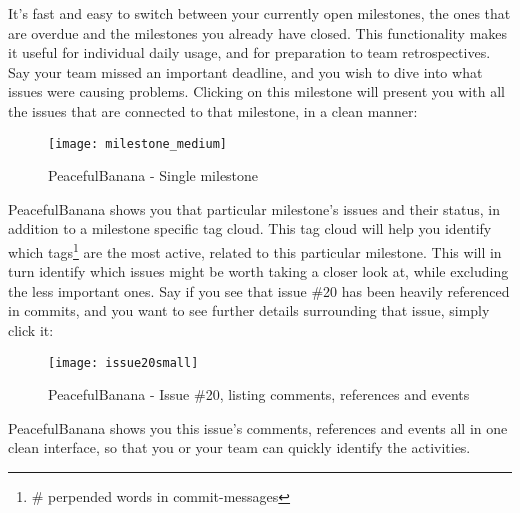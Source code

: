It's fast and easy to switch between your currently open milestones, the ones that are overdue and the milestones you already have closed. This functionality makes it useful for individual daily usage, and for preparation to team retrospectives. Say your team missed an important deadline, and you wish to dive into what issues were causing problems. Clicking on this milestone will present you with all the issues that are connected to that milestone, in a clean manner:
\begin{figure}[h!]
\label{milestonessingular}
\centering
	\texttt{[image: milestone\_medium]}
\caption{PeacefulBanana - Single milestone}
\end{figure}
PeacefulBanana shows you that particular milestone's issues and their status, in addition to a milestone specific tag cloud. This tag cloud will help you identify which tags\footnote{\# perpended words in commit-messages} are the most active, related to this particular milestone. This will in turn identify which issues might be worth taking a closer look at, while excluding the less important ones. 
Say if you see that issue \#20 has been heavily referenced in commits, and you want to see further details surrounding that issue, simply click it:
\begin{figure}[h!]
\label{milestonessingular}
\centering
	\texttt{[image: issue20small]}
\caption{PeacefulBanana - Issue \#20, listing comments, references and events}
\end{figure}
PeacefulBanana shows you this issue's comments, references and events all in one clean interface, so that you or your team can quickly identify the activities. 

%
%

